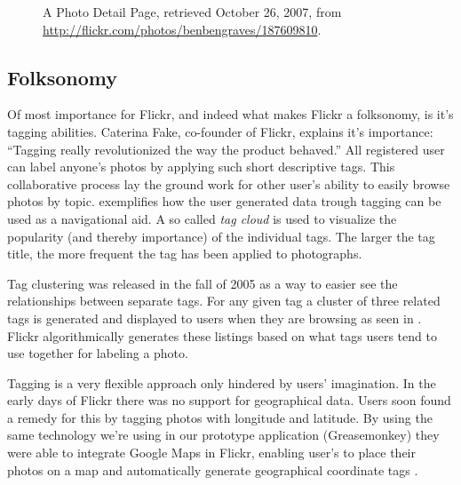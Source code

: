 \begin{figure}[b]
\begin{whole}
\begin{minipage}[t]{0.475\wholewidth}
      \caption[Flickr Photo Detail Page]{%
         A Photo Detail Page,
         retrieved October 26, 2007, from
         \url{http://flickr.com/photos/benbengraves/187609810}.}
      \label{figure:scrsh.flickr.photo.detail}
    \end{minipage}
  \end{whole}
  \normalcaption
\end{figure}

\subsection{Folksonomy}
Of most importance
for Flickr, and indeed what makes Flickr a folksonomy, is it's tagging
abilities. Caterina Fake, co-founder of Flickr, explains it's importance:
``Tagging really revolutionized the way the product behaved.''
\citep[p.~261]{livingston07}
All
registered user can label anyone's photos by applying such short descriptive
tags. This collaborative process lay the ground work for other user's ability
to easily browse photos by topic.
exemplifies how the user generated data trough tagging can be used as a
navigational aid. A so called \emph{tag cloud} is used to visualize the
popularity (and thereby importance) of the individual tags. The larger the
tag title, the more frequent the tag has been applied to photographs.

Tag clustering was released in the fall of 2005 \citep{butterfield05} as a way
to easier see the relationships between separate tags. For any given tag a
cluster of three related tags is generated and displayed to users when they
are browsing as seen in
.
Flickr algorithmically generates these listings based on what tags users tend
to use together for labeling a photo.

Tagging is a very flexible approach only hindered by users' imagination. In the
early days of Flickr there was no support for geographical data. Users soon
found a remedy for this by tagging photos with longitude and latitude. By
using the same technology we're using in our prototype application
(Greasemonkey) they were able to integrate Google Maps%
 in Flickr, enabling user's to place their photos on a map and automatically
generate geographical coordinate tags%
.

